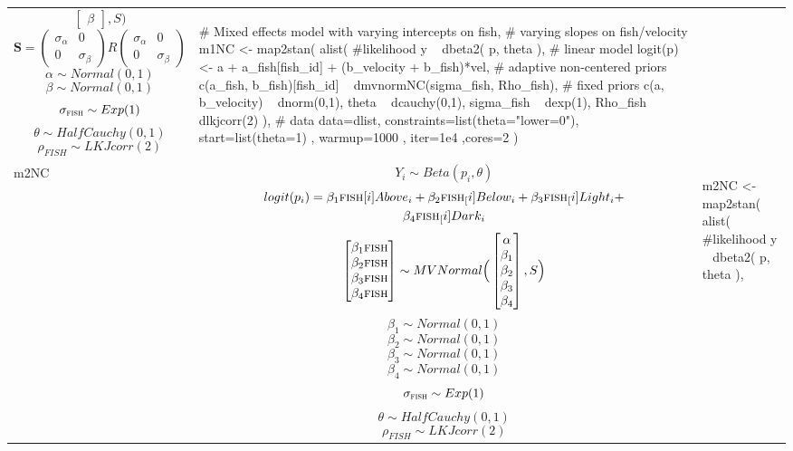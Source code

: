 \begin{longtable}{ l | p{}| p{} }
$$\begin{bmatrix}
\beta
\end{bmatrix}, S \Big)
$$
$$
\mathbf{S} = \left( \begin{array}{cc}
\sigma_\alpha & 0 \\
0 & \sigma_\beta
\end{array} \right) R \left( \begin{array}{cc}
\sigma_\alpha & 0 \\
0 & \sigma_\beta
\end{array} \right)
$$
$$ \alpha \sim Normal(0,1) $$
$$ \beta  \sim Normal(0,1) $$
$$ \sigma_{\textsc{fish}} \sim Exp(1) $$
$$ \theta \sim HalfCauchy(0, 1) $$
$$ \rho_{FISH} \sim LKJcorr(2) $$
&
{\begin{mylist}
# Mixed effects model with varying intercepts on fish, 
# varying slopes on fish/velocity
m1NC <- map2stan(
  alist(
    #likelihood
    y ~ dbeta2( p, theta ),
    # linear model
    logit(p) <- a + a_fish[fish_id] + (b_velocity + b_fish)*vel,
    # adaptive non-centered priors 
    c(a_fish, b_fish)[fish_id] ~ dmvnormNC(sigma_fish, Rho_fish),
    # fixed priors
    c(a, b_velocity) ~ dnorm(0,1),
    theta ~ dcauchy(0,1),
    sigma_fish ~ dexp(1),
    Rho_fish ~ dlkjcorr(2)
  ),
  # data
  data=dlist,
  constraints=list(theta="lower=0"),
  start=list(theta=1) , warmup=1000 , iter=1e4 ,cores=2 ) \end{mylist}} 
\\ %
m2NC &
$$ Y_i \sim Beta(p_i, \theta) $$
\small 
\begin{multline*} 
$$ logit(p_i) = \beta_1{\textsc{fish}[i]}Above_i  + \beta_2{\textsc{fish}_[i]}Below_i + \beta_3{\textsc{fish}_[i]} Light_i  + \\
\beta_4{\textsc{fish}_[i]} Dark_i $$
\end{multline*}
$$
\begin{bmatrix}
\beta_1{\textsc{fish}}\\
\beta_2{\textsc{fish}} \\
\beta_3{\textsc{fish}} \\
\beta_4{\textsc{fish}} \\
\end{bmatrix} \sim MVNormal \Big(
\begin{bmatrix}
\alpha \\
\beta_1 \\
\beta_2 \\
\beta_3 \\
\beta_4 \\
\end{bmatrix}, S \Big)
$$
$$ \beta_1  \sim Normal(0,1) $$
$$ \beta_2  \sim Normal(0,1) $$
$$ \beta_3  \sim Normal(0,1) $$
$$ \beta_4  \sim Normal(0,1) $$
$$ \sigma_{\textsc{fish}} \sim Exp(1) $$
$$ \theta \sim HalfCauchy(0, 1) $$
$$ \rho_{FISH} \sim LKJcorr(2) $$
&
{\begin{mylist}
m2NC <- map2stan(
  alist(
    #likelihood
    y ~ dbeta2( p, theta ),
    

\end{mylist}}
\end{longtable}
